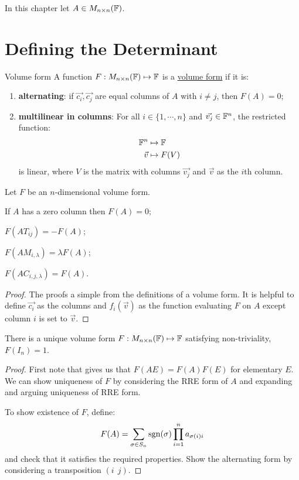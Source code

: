 \documentclass[../Main.tex]{subfiles}
\begin{document}
In this chapter let $A \in M_{n \times n}(\mathbb{F})$.
\section{Defining the Determinant}
\begin{definition}{Volume form}
    A function $F : M_{n \times n}(\mathbb{F}) \mapsto \mathbb{F}$ is a \underline{volume form} if it is:
    \begin{enumerate}
        \item \textbf{alternating}: if $\vec{c_{i}}, \vec{c_{j}}$ are equal columns of $A$ with $i \neq j$, then $F(A) = 0$;
        \item \textbf{multilinear in columns}: For all $i \in \{1, \cdots, n\}$ and $\vec{v_j} \in \mathbb{F}^n$, the restricted function:
            \begin{align*}
                \mathbb{F}^n &\mapsto \mathbb{F}\\
                \vec{v} &\mapsto F(V)
            \end{align*}
            is linear, where $V$ is the matrix with columns $\vec{v_j}$ and $\vec{v}$ as the $i$th column.
    \end{enumerate}
\end{definition}
\begin{propositions}{
        Let $F$ be an $n$-dimensional volume form.
        \label{propsVolFormProps}
    }
    \item If $A$ has a zero column then $F(A) = 0$;
    \item $F(AT_{ij}) = -F(A)$;
    \item $F(AM_{i, \lambda}) = \lambda F(A)$;
    \item $F(AC_{i, j, \lambda}) = F(A)$.
\end{propositions}
\begin{proof}
    The proofs a simple from the definitions of a volume form. It is helpful to define $\vec{c_{i}}$ as the columns and $f_i(\vec{v})$ as the function evaluating $F$ on $A$ except column $i$ is set to $\vec{v}$.
\end{proof}
\begin{theorem}
    There is a unique volume form $F : M_{n \times n}(\mathbb{F}) \mapsto \mathbb{F}$ satisfying non-triviality, $F(I_n) = 1$.
    \label{thmDeterminant}
\end{theorem}
\begin{proof}
    First note that  gives us that $F(AE) = F(A) F(E)$ for elementary $E$. We can show uniqueness of $F$ by considering the RRE form of $A$ and expanding and arguing uniqueness of RRE form.

    To show existence of $F$, define:
    \begin{equation*}
        F(A) = \sum_{\sigma \in S_n} \operatorname{sgn}(\sigma) \prod_{i=1}^n a_{\sigma(i) i}
    \end{equation*}
    and check that it satisfies the required properties. Show the alternating form by considering a transposition $(i~~j)$.
\end{proof}
\end{document}
